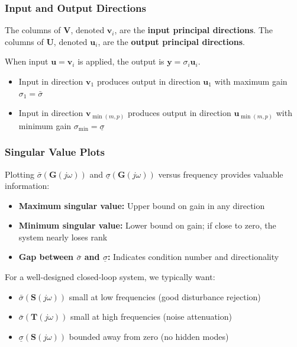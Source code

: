 \subsubsection{Input and Output Directions}

The columns of $\mathbf{V}$, denoted $\mathbf{v}_i$, are the \textbf{input principal directions}. The columns of $\mathbf{U}$, denoted $\mathbf{u}_i$, are the \textbf{output principal directions}.

When input $\mathbf{u} = \mathbf{v}_i$ is applied, the output is $\mathbf{y} = \sigma_i \mathbf{u}_i$.

\begin{itemize}
\item Input in direction $\mathbf{v}_1$ produces output in direction $\mathbf{u}_1$ with maximum gain $\sigma_1 = \bar{\sigma}$
\item Input in direction $\mathbf{v}_{\min(m,p)}$ produces output in direction $\mathbf{u}_{\min(m,p)}$ with minimum gain $\sigma_{\min} = \underline{\sigma}$
\end{itemize}

\subsubsection{Singular Value Plots}

Plotting $\bar{\sigma}(\mathbf{G}(j\omega))$ and $\underline{\sigma}(\mathbf{G}(j\omega))$ versus frequency provides valuable information:

\begin{itemize}
\item \textbf{Maximum singular value:} Upper bound on gain in any direction
\item \textbf{Minimum singular value:} Lower bound on gain; if close to zero, the system nearly loses rank
\item \textbf{Gap between $\bar{\sigma}$ and $\underline{\sigma}$:} Indicates condition number and directionality
\end{itemize}

For a well-designed closed-loop system, we typically want:
\begin{itemize}
\item $\bar{\sigma}(\mathbf{S}(j\omega))$ small at low frequencies (good disturbance rejection)
\item $\bar{\sigma}(\mathbf{T}(j\omega))$ small at high frequencies (noise attenuation)
\item $\underline{\sigma}(\mathbf{S}(j\omega))$ bounded away from zero (no hidden modes)
\end{itemize}

